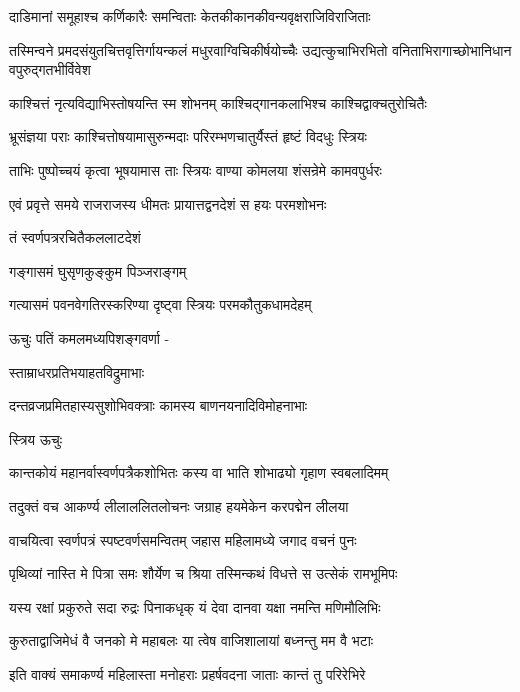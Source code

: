 \twolineshloka
{दाडिमानां समूहाश्च कर्णिकारैः समन्विताः}
{केतकीकानकीवन्यवृक्षराजिविराजिताः}%

\twolineshloka
{तस्मिन्वने प्रमदसंयुतचित्तवृत्तिर्गायन्कलं मधुरवाग्विचिकीर्षयोच्चैः}
{उद्यत्कुचाभिरभितो वनिताभिरागाच्छोभानिधान वपुरुद्गतभीर्विवेश}%

\twolineshloka
{काश्चित्तं नृत्यविद्याभिस्तोषयन्ति स्म शोभनम्}
{काश्चिद्गानकलाभिश्च काश्चिद्वाक्चतुरोचितैः}%

\twolineshloka
{भ्रूसंज्ञया पराः काश्चित्तोषयामासुरुन्मदाः}
{परिरम्भणचातुर्यैस्तं हृष्टं विदधुः स्त्रियः}%

\twolineshloka
{ताभिः पुष्पोच्चयं कृत्वा भूषयामास ताः स्त्रियः}
{वाण्या कोमलया शंसन्रेमे कामवपुर्धरः}%

\twolineshloka
{एवं प्रवृत्ते समये राजराजस्य धीमतः}
{प्रायात्तद्वनदेशं स हयः परमशोभनः}%

तं स्वर्णपत्ररचितैकललाटदेशं

गङ्गासमं घुसृणकुङ्कुम पिञ्जराङ्गम्

\twolineshloka
{गत्यासमं पवनवेगतिरस्करिण्या}
{दृष्ट्वा स्त्रियः परमकौतुकधामदेहम्}%

ऊचुः पतिं कमलमध्यपिशङ्गवर्णा -

स्ताम्राधरप्रतिभयाहतविद्रुमाभाः

\twolineshloka
{दन्तव्रजप्रमितहास्यसुशोभिवक्त्राः}
{कामस्य बाणनयनादिविमोहनाभाः}%

स्त्रिय ऊचुः

\twolineshloka
{कान्तकोयं महानर्वास्वर्णपत्रैकशोभितः}
{कस्य वा भाति शोभाढ्यो गृहाण स्वबलादिमम्}%


\twolineshloka
{तदुक्तं वच आकर्ण्य लीलाललितलोचनः}
{जग्राह हयमेकेन करपद्मेन लीलया}%

\twolineshloka
{वाचयित्वा स्वर्णपत्रं स्पष्टवर्णसमन्वितम्}
{जहास महिलामध्ये जगाद वचनं पुनः}%


\twolineshloka
{पृथिव्यां नास्ति मे पित्रा समः शौर्येण च श्रिया}
{तस्मिन्कथं विधत्ते स उत्सेकं रामभूमिपः}%

\twolineshloka
{यस्य रक्षां प्रकुरुते सदा रुद्रः पिनाकधृक्}
{यं देवा दानवा यक्षा नमन्ति मणिमौलिभिः}%

\twolineshloka
{कुरुताद्वाजिमेधं वै जनको मे महाबलः}
{या त्वेष वाजिशालायां बध्नन्तु मम वै भटाः}%

\twolineshloka
{इति वाक्यं समाकर्ण्य महिलास्ता मनोहराः}
{प्रहर्षवदना जाताः कान्तं तु परिरेभिरे}%


